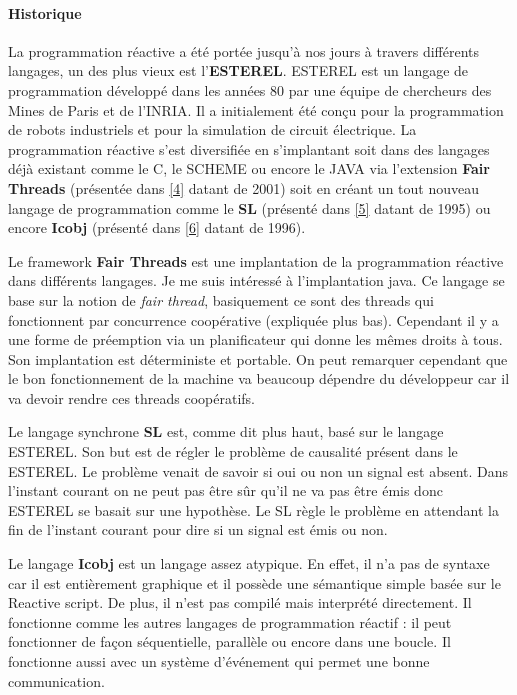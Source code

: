\documentclass[10pt,a4paper]{report}
\begin{document}
	\paragraph{Historique} La programmation réactive a été portée jusqu'à nos jours à travers différents langages, un des plus vieux est l'\textbf{ESTEREL}. ESTEREL est un langage de programmation développé dans les années 80 par une équipe de chercheurs des Mines de Paris et de l’INRIA. Il a initialement été conçu pour la programmation de robots industriels et pour la simulation de circuit électrique. La programmation réactive s'est diversifiée en s'implantant soit dans des langages déjà existant comme le C, le SCHEME ou encore le JAVA via l'extension \textbf{Fair Threads} (présentée dans \hyperref[FT]{[4]} datant de 2001) soit en créant un tout nouveau langage de programmation comme le \textbf{SL} (présenté dans \hyperref[SL]{[5]} datant de 1995) ou encore \textbf{Icobj} (présenté dans \hyperref[IJ]{[6]} datant de 1996).
	\medbreak
	
	Le framework \textbf{Fair Threads} est une implantation de la programmation réactive dans différents langages. Je me suis intéressé à l'implantation java. Ce langage se base sur la notion de \textit{fair thread}, basiquement ce sont des threads qui fonctionnent par concurrence coopérative (expliquée plus bas). Cependant il y a une forme de préemption via un planificateur qui donne les mêmes droits à tous. Son implantation est déterministe et portable. On peut remarquer cependant que le bon fonctionnement de la machine va beaucoup dépendre du développeur car il va devoir rendre ces threads coopératifs.
	\medbreak
	
	Le langage synchrone \textbf{SL} est, comme dit plus haut, basé sur le langage ESTEREL. Son but est de régler le problème de causalité présent dans le ESTEREL. Le problème venait de savoir si oui ou non un signal est absent. Dans l'instant courant on ne peut pas être sûr qu'il ne va pas être émis donc ESTEREL se basait sur une hypothèse. Le SL règle le problème en attendant la fin de l'instant courant pour dire si un signal est émis ou non. 
	\medbreak
	
	Le langage \textbf{Icobj} est un langage assez atypique. En effet, il n'a pas de syntaxe car il est entièrement graphique et il possède une sémantique simple basée sur le Reactive script. De plus, il n'est pas compilé mais interprété directement. Il fonctionne comme les autres langages de programmation réactif : il peut fonctionner de façon séquentielle, parallèle ou encore dans une boucle. Il fonctionne aussi avec un système d'événement qui permet une bonne communication. 
	\bigbreak
	
\end{document}
